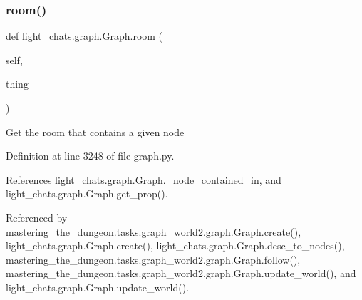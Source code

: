 \subsubsection{\texorpdfstring{room()}{room()}}
{\footnotesize\ttfamily def light\+\_\+chats.\+graph.\+Graph.\+room (\begin{DoxyParamCaption}\item[{}]{self,  }\item[{}]{thing }\end{DoxyParamCaption})}

\begin{DoxyVerb}Get the room that contains a given node\end{DoxyVerb}
 

Definition at line 3248 of file graph.\+py.



References light\+\_\+chats.\+graph.\+Graph.\+\_\+node\+\_\+contained\+\_\+in, and light\+\_\+chats.\+graph.\+Graph.\+get\+\_\+prop().



Referenced by mastering\+\_\+the\+\_\+dungeon.\+tasks.\+graph\+\_\+world2.\+graph.\+Graph.\+create(), light\+\_\+chats.\+graph.\+Graph.\+create(), light\+\_\+chats.\+graph.\+Graph.\+desc\+\_\+to\+\_\+nodes(), mastering\+\_\+the\+\_\+dungeon.\+tasks.\+graph\+\_\+world2.\+graph.\+Graph.\+follow(), mastering\+\_\+the\+\_\+dungeon.\+tasks.\+graph\+\_\+world2.\+graph.\+Graph.\+update\+\_\+world(), and light\+\_\+chats.\+graph.\+Graph.\+update\+\_\+world().

